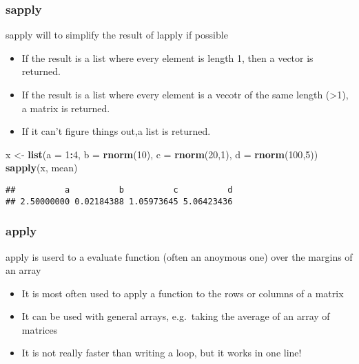 \documentclass[
]{article}
\newenvironment{Shaded}{\begin{snugshade}}{\end{snugshade}}
\newcommand{\DataTypeTok}[1]{\textcolor[rgb]{0.13,0.29,0.53}{#1}}
\newcommand{\DecValTok}[1]{\textcolor[rgb]{0.00,0.00,0.81}{#1}}
\newcommand{\KeywordTok}[1]{\textcolor[rgb]{0.13,0.29,0.53}{\textbf{#1}}}
\newcommand{\NormalTok}[1]{#1}
\newcommand{\OperatorTok}[1]{\textcolor[rgb]{0.81,0.36,0.00}{\textbf{#1}}}
\newcommand{\StringTok}[1]{\textcolor[rgb]{0.31,0.60,0.02}{#1}}
\begin{document}
\hypertarget{sapply}{%
\subsubsection{sapply}\label{sapply}}

sapply will to simplify the result of lapply if possible

\begin{itemize}
\item
  If the result is a list where every element is length 1, then a vector
  is returned.
\item
  If the result is a list where every element is a vecotr of the same
  length (\textgreater1), a matrix is returned.
\item
  If it can't figure things out,a list is returned.
\end{itemize}

\begin{Shaded}
\begin{Highlighting}[]
\NormalTok{x \textless{}{-}}\StringTok{ }\KeywordTok{list}\NormalTok{(}\DataTypeTok{a =} \DecValTok{1}\OperatorTok{:}\DecValTok{4}\NormalTok{, }\DataTypeTok{b =} \KeywordTok{rnorm}\NormalTok{(}\DecValTok{10}\NormalTok{), }\DataTypeTok{c =} \KeywordTok{rnorm}\NormalTok{(}\DecValTok{20}\NormalTok{,}\DecValTok{1}\NormalTok{), }\DataTypeTok{d =} \KeywordTok{rnorm}\NormalTok{(}\DecValTok{100}\NormalTok{,}\DecValTok{5}\NormalTok{))}
\KeywordTok{sapply}\NormalTok{(x, mean)}
\end{Highlighting}
\end{Shaded}

\begin{verbatim}
##          a          b          c          d 
## 2.50000000 0.02184388 1.05973645 5.06423436
\end{verbatim}

\hypertarget{apply}{%
\subsubsection{apply}\label{apply}}

apply is userd to a evaluate function (often an anoymous one) over the
margins of an array

\begin{itemize}
\item
  It is most often used to apply a function to the rows or columns of a
  matrix
\item
  It can be used with general arrays, e.g.~taking the average of an
  array of matrices
\item
  It is not really faster than writing a loop, but it works in one line!
\end{itemize}
\end{document}
